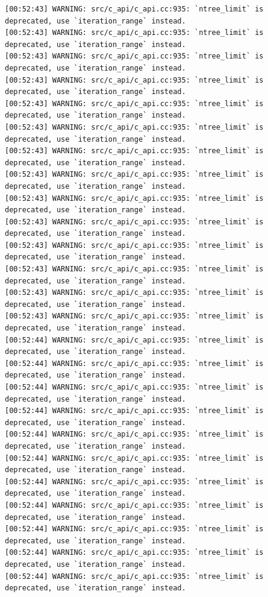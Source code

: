 \documentclass[
  letterpaper,
  DIV=11,
  numbers=noendperiod]{scrartcl}
\begin{document}
\begin{verbatim}
[00:52:43] WARNING: src/c_api/c_api.cc:935: `ntree_limit` is deprecated, use `iteration_range` instead.
[00:52:43] WARNING: src/c_api/c_api.cc:935: `ntree_limit` is deprecated, use `iteration_range` instead.
[00:52:43] WARNING: src/c_api/c_api.cc:935: `ntree_limit` is deprecated, use `iteration_range` instead.
[00:52:43] WARNING: src/c_api/c_api.cc:935: `ntree_limit` is deprecated, use `iteration_range` instead.
[00:52:43] WARNING: src/c_api/c_api.cc:935: `ntree_limit` is deprecated, use `iteration_range` instead.
[00:52:43] WARNING: src/c_api/c_api.cc:935: `ntree_limit` is deprecated, use `iteration_range` instead.
[00:52:43] WARNING: src/c_api/c_api.cc:935: `ntree_limit` is deprecated, use `iteration_range` instead.
[00:52:43] WARNING: src/c_api/c_api.cc:935: `ntree_limit` is deprecated, use `iteration_range` instead.
[00:52:43] WARNING: src/c_api/c_api.cc:935: `ntree_limit` is deprecated, use `iteration_range` instead.
[00:52:43] WARNING: src/c_api/c_api.cc:935: `ntree_limit` is deprecated, use `iteration_range` instead.
[00:52:43] WARNING: src/c_api/c_api.cc:935: `ntree_limit` is deprecated, use `iteration_range` instead.
[00:52:43] WARNING: src/c_api/c_api.cc:935: `ntree_limit` is deprecated, use `iteration_range` instead.
[00:52:43] WARNING: src/c_api/c_api.cc:935: `ntree_limit` is deprecated, use `iteration_range` instead.
[00:52:43] WARNING: src/c_api/c_api.cc:935: `ntree_limit` is deprecated, use `iteration_range` instead.
[00:52:44] WARNING: src/c_api/c_api.cc:935: `ntree_limit` is deprecated, use `iteration_range` instead.
[00:52:44] WARNING: src/c_api/c_api.cc:935: `ntree_limit` is deprecated, use `iteration_range` instead.
[00:52:44] WARNING: src/c_api/c_api.cc:935: `ntree_limit` is deprecated, use `iteration_range` instead.
[00:52:44] WARNING: src/c_api/c_api.cc:935: `ntree_limit` is deprecated, use `iteration_range` instead.
[00:52:44] WARNING: src/c_api/c_api.cc:935: `ntree_limit` is deprecated, use `iteration_range` instead.
[00:52:44] WARNING: src/c_api/c_api.cc:935: `ntree_limit` is deprecated, use `iteration_range` instead.
[00:52:44] WARNING: src/c_api/c_api.cc:935: `ntree_limit` is deprecated, use `iteration_range` instead.
[00:52:44] WARNING: src/c_api/c_api.cc:935: `ntree_limit` is deprecated, use `iteration_range` instead.
[00:52:44] WARNING: src/c_api/c_api.cc:935: `ntree_limit` is deprecated, use `iteration_range` instead.
[00:52:44] WARNING: src/c_api/c_api.cc:935: `ntree_limit` is deprecated, use `iteration_range` instead.
[00:52:44] WARNING: src/c_api/c_api.cc:935: `ntree_limit` is deprecated, use `iteration_range` instead.

\end{verbatim}
\end{document}
